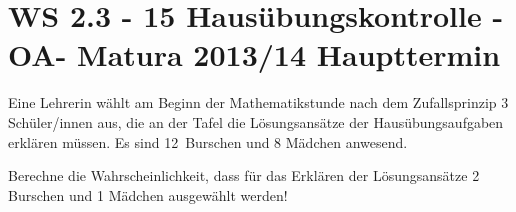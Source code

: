 \section{WS 2.3 - 15 Hausübungskontrolle - OA- Matura 2013/14 Haupttermin}

\begin{beispiel}[WS 2.3]{1} %
				Eine Lehrerin wählt am Beginn der Mathematikstunde nach dem Zufallsprinzip 3 Schüler/innen aus, die an der Tafel die Lösungsansätze der Hausübungsaufgaben erklären müssen. Es sind 12 Burschen und 8 Mädchen anwesend. 
				
Berechne die Wahrscheinlichkeit, dass für das Erklären der Lösungsansätze 2 Burschen und 1 Mädchen ausgewählt werden!\leer


\end{beispiel}